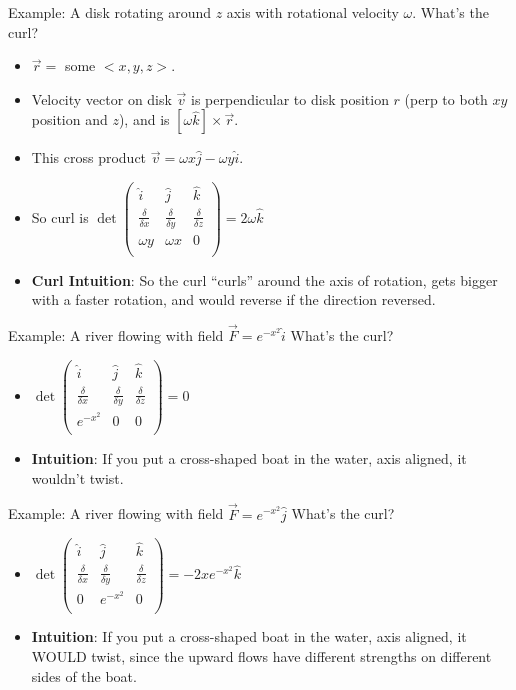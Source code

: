 \documentclass[11pt, oneside]{article}   	%
\begin{document}
Example: A disk rotating around $z$ axis with rotational velocity $\omega$.  What's the curl?
\begin{itemize}
\item $\vec{r} = $ some $<x, y, z>$.
\item Velocity vector on disk $\vec{v}$ is perpendicular to disk position $r$ (perp to both $xy$ position and $z$), and is $[\omega \hat{k}] \times \vec{r}$.
\item This cross product $\vec{v} = \omega x \hat{j} - \omega y \hat{i}$.
\item So curl is $\det\begin{pmatrix}
\hat{i} &\hat{j} &\hat{k}  \\
\frac{\delta}{\delta x} &\frac{\delta}{\delta y} &\frac{\delta}{\delta z}  \\
\omega y & \omega x& 0 \\
\end{pmatrix} = 2\omega \hat{k}$
\item \textbf{Curl Intuition}: So the curl ``curls'' around the axis of rotation, gets bigger with a faster rotation, and would reverse if the direction reversed. 
\end{itemize}

Example: A river flowing with field $\vec{F} = e^{-x^2} \hat{i}$  What's the curl?
\begin{itemize}
\item  $\det\begin{pmatrix}
\hat{i} &\hat{j} &\hat{k}  \\
\frac{\delta}{\delta x} &\frac{\delta}{\delta y} &\frac{\delta}{\delta z}  \\
e^{-x^2} & 0 & 0 \\
\end{pmatrix} = 0$
\item  \textbf{Intuition}: If you put a cross-shaped boat in the water, axis aligned, it wouldn't twist.
\end{itemize}

Example: A river flowing with field $\vec{F} = e^{-x^2} \hat{j}$  What's the curl?
\begin{itemize}
\item  $\det\begin{pmatrix}
\hat{i} &\hat{j} &\hat{k}  \\
\frac{\delta}{\delta x} &\frac{\delta}{\delta y} &\frac{\delta}{\delta z}  \\
0 & e^{-x^2} & 0 \\
\end{pmatrix} = -2xe^{-x^2}\hat{k}$
\item  \textbf{Intuition}: If you put a cross-shaped boat in the water, axis aligned, it WOULD twist, since the upward flows have different strengths on different sides of the boat.
\end{itemize}
\end{document}
